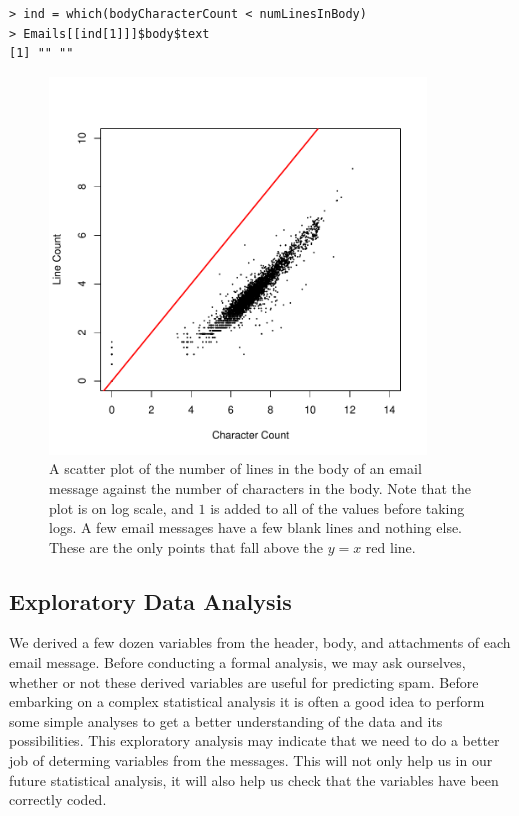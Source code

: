 \begin{verbatim}
> ind = which(bodyCharacterCount < numLinesInBody)
> Emails[[ind[1]]]$body$text
[1] "" ""
\end{verbatim}

\begin{figure}
\includegraphics[width=10cm]{Spam/CharVSLineCount.pdf}
\caption{A scatter plot of the number of lines in the 
body of an email message against the number of characters
in the body.  Note that the plot is on log scale, and $1$
is added to all of the values before taking logs.
A few email messages have a few blank lines and nothing
else. These are the only points that fall above the 
$y = x$ red line.}
\label{fig:compareCharLines}
\end{figure}


\subsection{Exploratory Data Analysis}

We derived a few dozen variables from the header, body, and
attachments of each email message. 
Before conducting a formal analysis, we may ask ourselves,
whether or not these derived variables are useful
for predicting spam.
Before embarking on a complex statistical analysis it is
often a good idea to perform some simple analyses to get
a better understanding of the data and its possibilities.
This exploratory analysis may indicate that we need to
do a better job of determing variables from the messages.
This will not only help us in our future statistical
analysis, it will also help us check that the variables
have been correctly coded.

